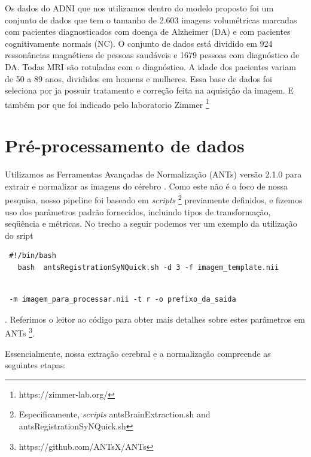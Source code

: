 \documentclass[openright]{UFRGS} %
\begin{document}
Os dados do ADNI que nos utilizamos  dentro do modelo proposto foi
um conjunto de dados que tem o tamanho de 2.603 imagens volumétricas marcadas com pacientes diagnosticados com doença de Alzheimer (DA) e com pacientes cognitivamente normais (NC). O conjunto de dados está dividido em 924 ressonâncias magnéticas de pessoas saudáveis e 1679 pessoas com diagnóstico de DA. Todas MRI são rotuladas com o diagnóstico. A idade dos pacientes variam de 50 a 89 anos, divididos em homens e mulheres. Essa base de dados foi seleciona por ja possuir tratamento e correção  feita na aquisição da imagem. E também por que foi indicado pelo 
laboratorio  Zimmer \footnote[1]{https://zimmer-lab.org/} 






\section{Pré-processamento de dados}
Utilizamos as Ferramentas Avançadas de Normalização (ANTs)  versão 2.1.0 para extrair e normalizar as imagens do cérebro \cite{avants2009advanced} . Como este não é o foco de nossa pesquisa, nosso pipeline foi baseado em \textit{scripts} \footnote[1]{Especificamente,  \textit{scripts} antsBrainExtraction.sh and antsRegistrationSyNQuick.sh}
 previamente definidos, e fizemos uso dos parâmetros padrão fornecidos,
incluindo tipos de transformação, seqüência e métricas. No trecho a seguir podemos ver um exemplo da utilização do sript 

\begin{verbatim}
 #!/bin/bash
   bash  antsRegistrationSyNQuick.sh -d 3 -f imagem_template.nii 
  
\end{verbatim}

\begin{verbatim}
 -m imagem_para_processar.nii -t r -o prefixo_da_saida
\end{verbatim}
. Referimos o leitor ao código para obter mais detalhes sobre estes parâmetros em ANTs \footnote{ https://github.com/ANTsX/ANTs}. 

Essencialmente, nossa extração cerebral e a normalização compreende as seguintes etapas:
\end{document}

